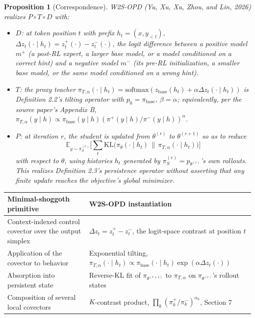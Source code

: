 \documentclass[11pt]{article}
\newtheorem{proposition}[definition]{Proposition}
\begin{document}
\begin{proposition}[Correspondence]
W2S-OPD \cite{yu_w2s_opd_2026} (Yu, Xu, Xu, Zhou, and Lin, 2026) realizes $P \circ T \circ D$ with:
\begin{itemize}[nosep]
\item $D$: at token position $t$ with prefix $h_t = (x, y_{<t})$, $\Delta z_t(\cdot \mid h_t) = z_t^{+}(\cdot) - z_t^{-}(\cdot)$, the logit difference between a positive model $m^{+}$ (a post-RL expert, a larger base model, or a model conditioned on a correct hint) and a negative model $m^{-}$ (its pre-RL initialization, a smaller base model, or the same model conditioned on a wrong hint).
\item $T$: the proxy teacher $\pi_{T,\alpha}(\cdot \mid h_t) = \text{softmax}(z_{\text{base}}(h_t) + \alpha \Delta z_t(\cdot \mid h_t))$ is Definition 2.2's tilting operator with $p_0 = \pi_{\text{base}}$, $\beta = \alpha$; equivalently, per the source paper's Appendix B, $\pi_{T,\alpha}(y \mid h) \propto \pi_{\text{base}}(y \mid h)(\pi^{+}(y\mid h)/\pi^{-}(y\mid h))^\alpha$.
\item $P$: at iteration $r$, the student is updated from $\theta^{(r)}$ to $\theta^{(r+1)}$ so as to reduce
\[
\mathbb{E}_{y \sim \pi_S^{(r)}}\Big[\sum_t \text{KL}\big(\pi_\theta(\cdot \mid h_t) \,\big\|\, \pi_{T,\alpha}(\cdot \mid h_t)\big)\Big]
\]
with respect to $\theta$, using histories $h_t$ generated by $\pi_S^{(r)} = p_{\theta^{(r)}}$'s own rollouts. This realizes Definition 2.3's persistence operator without asserting that any finite update reaches the objective's global minimizer.
\end{itemize}
\end{proposition}

\begin{center}
\begin{tabular}{@{}p{4.3cm}p{8.3cm}@{}}
\toprule
Minimal-shoggoth primitive & W2S-OPD instantiation \\
\midrule
Context-indexed control covector over the output simplex & $\Delta z_t = z_t^{+} - z_t^{-}$, the logit-space contrast at position $t$ \\
Application of the covector to behavior & Exponential tilting, $\pi_{T,\alpha}(\cdot \mid h_t) \propto \pi_{\text{base}}(\cdot \mid h_t)\exp(\alpha \Delta z_t(\cdot))$ \\
Absorption into persistent state & Reverse-KL fit of $\pi_{\theta^{(r+1)}}$ to $\pi_{T,\alpha}$ on $\pi_{\theta^{(r)}}$'s rollout states \\
Composition of several local covectors & $K$-contrast product, $\prod_k (\pi_k^{+}/\pi_k^{-})^{\alpha_k}$, Section 7 \\
\bottomrule
\end{tabular}
\end{center}
\end{document}
